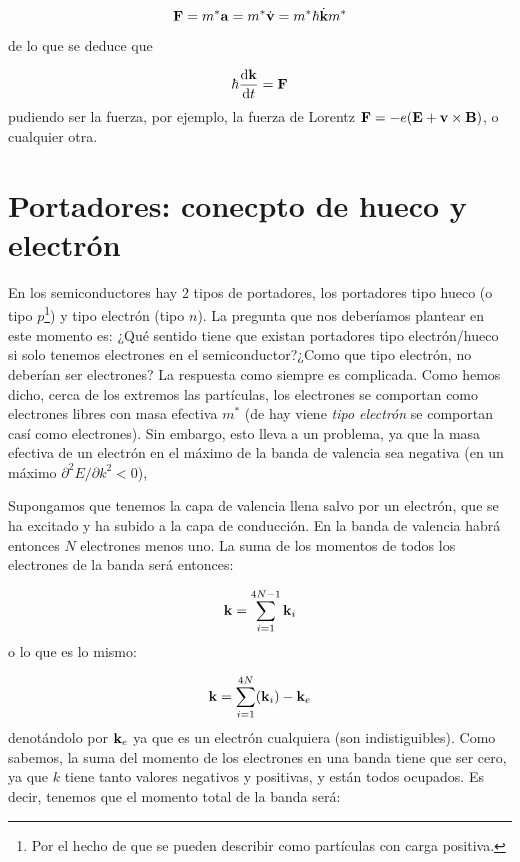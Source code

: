 \begin{equation}
	\mathbf{F} = m^* \mathbf{a} = m^* \dot{\mathbf{v}} = m^* \hbar \dot{\mathbf{k}}{m^*} 
\end{equation}
de lo que se deduce que 

\begin{equation}
	\hbar \frac{\mathrm{d} \mathbf{k}}{\mathrm{d} t} = \mathbf{F}
\end{equation}
pudiendo ser la fuerza, por ejemplo, la fuerza de Lorentz $\mathbf{F}=-e(\mathbf{E}+\mathbf{v} \times \mathbf{B})$, o cualquier otra.

\section{Portadores: conecpto de hueco y electrón}

En los semiconductores hay 2 tipos de portadores, los portadores tipo hueco (o tipo $p$\footnote{Por el hecho de que se pueden describir como partículas con carga positiva.}) y tipo electrón (tipo $n$). La pregunta que nos deberíamos plantear en este momento es: ¿Qué sentido tiene que existan portadores tipo electrón/hueco si solo tenemos electrones en el semiconductor?¿Como que tipo electrón, no deberían ser electrones? La respuesta como siempre es complicada. Como hemos dicho, cerca de los extremos las partículas, los electrones se comportan como electrones libres con masa efectiva $m^*$ (de hay viene \textit{tipo electrón} se comportan casí como electrones). Sin embargo, esto lleva a un problema, ya que la masa efectiva de un electrón en el máximo de la banda de valencia sea negativa (en un máximo $\partial^2 E/ \partial k^2<0$), 

Supongamos que tenemos la capa de valencia llena salvo por un electrón, que se ha excitado y ha subido a la capa de conducción. En la banda de valencia habrá entonces $N$ electrones menos uno. La suma de los momentos de todos los electrones de la banda será entonces:

\begin{equation}
	\mathbf{k} = \sum_{i=1}^{4N-1} \mathbf{k}_i 
\end{equation}
o lo que es lo mismo:

\begin{equation}
	\mathbf{k} = \sum_{i=1}^{4N} (\mathbf{k}_i) - \mathbf{k}_e
\end{equation}
denotándolo por $\mathbf{k}_e$ ya que es un electrón cualquiera (son indistiguibles). Como sabemos, la suma del momento de los electrones en una banda tiene que ser cero, ya que $k$ tiene tanto valores negativos y positivas, y están todos ocupados. Es decir, tenemos que el momento total de la banda será:

